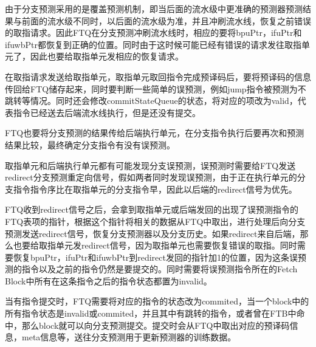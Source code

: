 由于分支预测采用的是覆盖预测机制，即当后面的流水级中更准确的预测器预测结果与前面的流水级不同时，以后面的流水级为准，并且冲刷流水线，恢复之前错误的取指请求。因此FTQ在分支预测冲刷流水线时，相应的要将bpuPtr，ifuPtr和ifuwbPtr都恢复到正确的位置。同时由于这时候可能已经有错误的请求发往取指单元了，因此也要给取指单元发相应的恢复请求。

在取指请求发送给取指单元，取指单元取回指令完成预译码后，要将预译码的信息传回给FTQ储存起来，同时要判断一些简单的误预测，例如jump指令被预测为不跳转等情况。同时还会修改commitStateQueue的状态，将对应的项改为valid，代表指令已经送去后端流水线执行，但是还没有提交。

FTQ也要将分支预测的结果传给后端执行单元，在分支指令执行后要再次和预测结果比较，最终确定分支指令有没有误预测。

取指单元和后端执行单元都有可能发现分支误预测，误预测时需要给FTQ发送redirect分支预测重定向信号，假如两者同时发现误预测，由于正在执行单元的分支指令指令序比在取指单元的分支指令早，因此以后端的redirect信号为优先。

FTQ收到redirect信号之后，会拿到取指单元或后端发回的出现了误预测指令的FTQ表项的指针，根据这个指针将相关的数据从FTQ中取出，进行处理后向分支预测发送redirect信号，恢复分支预测器以及分支历史。如果redirect来自后端，那么也要给取指单元发redirect信号，因为取指单元也需要恢复错误的取指。同时需要恢复bpuPtr，ifuPtr和ifuwbPtr到redirect发回的指针加1的位置，因为这条误预测的指令以及之前的指令仍然是要提交的。同时需要将误预测指令所在的Fetch Block中所有在这条指令之后的指令状态都置为invalid。

当有指令提交时，FTQ需要将对应的指令的状态改为commited，当一个block中的所有指令状态是invalid或commited，并且其中有跳转的指令，或者曾在FTB中命中，那么block就可以向分支预测提交。提交时会从FTQ中取出对应的预译码信息，meta信息等，送往分支预测用于更新预测器的训练数据。








